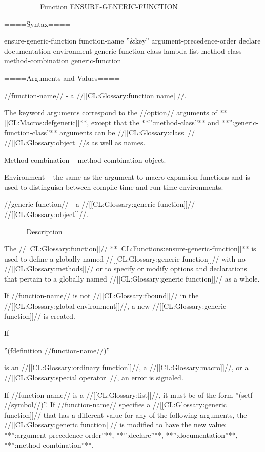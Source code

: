 ====== Function ENSURE-GENERIC-FUNCTION ======

====Syntax====

\DefunWithValuesNewline ensure-generic-function {function-name ''&key'' argument-precedence-order declare documentation environment generic-function-class lambda-list method-class method-combination} {generic-function}

====Arguments and Values====

//function-name// - a //[[CL:Glossary:function name]]//.

The keyword arguments correspond to the //option// arguments of **[[CL:Macros:defgeneric]]**, except that the **'':method-class''** and **'':generic-function-class''** arguments can be //[[CL:Glossary:class]]// //[[CL:Glossary:object]]//s as well as names.


{\keyword Method-combination} -- method combination object.

{\keyword Environment} -- the same as the  argument to macro expansion functions and is used to distinguish between compile-time and run-time environments.



//generic-function// - a //[[CL:Glossary:generic function]]// //[[CL:Glossary:object]]//.

====Description====

The //[[CL:Glossary:function]]// **[[CL:Functions:ensure-generic-function]]** is used to define a globally named //[[CL:Glossary:generic function]]// with no //[[CL:Glossary:methods]]// or to specify or modify options and declarations that pertain to a globally named //[[CL:Glossary:generic function]]// as a whole.


If //function-name// is not //[[CL:Glossary:fbound]]// in the //[[CL:Glossary:global environment]]//, a new //[[CL:Glossary:generic function]]// is created.

If

''(fdefinition //function-name//)''

is an //[[CL:Glossary:ordinary function]]//, a //[[CL:Glossary:macro]]//, or a //[[CL:Glossary:special operator]]//, an error is signaled.

If //function-name// is a //[[CL:Glossary:list]]//, it must be of the form ''(setf //symbol//)''. If //function-name// specifies a //[[CL:Glossary:generic function]]// that has a different value for any of the following arguments, the //[[CL:Glossary:generic function]]// is modified to have the new value: **'':argument-precedence-order''**, **'':declare''**, **'':documentation''**, **'':method-combination''**.

